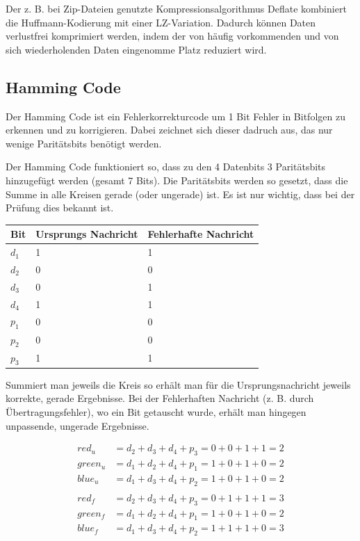 Der z. B. bei Zip-Dateien genutzte Kompressionsalgorithmus Deflate kombiniert
die Huffmann-Kodierung mit einer LZ-Variation. Dadurch können Daten verlustfrei
komprimiert werden, indem der von häufig vorkommenden und von sich wiederholenden
Daten eingenomme Platz reduziert wird. 

\subsection{Hamming Code}

Der Hamming Code ist ein Fehlerkorrekturcode um 1 Bit Fehler in Bitfolgen
zu erkennen und zu korrigieren. Dabei zeichnet sich dieser dadruch aus,
das nur wenige Paritätsbits benötigt werden.

Der Hamming Code funktioniert so, dass zu den 4 Datenbits 3 Paritätsbits
hinzugefügt werden (gesamt 7 Bits). Die Paritätsbits werden so gesetzt,
dass die Summe in alle Kreisen gerade (oder ungerade) ist. Es ist nur wichtig,
dass bei der Prüfung dies bekannt ist.

\begin{table}[H]
    \begin{tabular}{|l|l|l|}
    \hline
        Bit & Ursprungs Nachricht & Fehlerhafte Nachricht \\ \hline
        $d_1$ & 1 & 1 \\ \hline
        $d_2$ & 0 & 0 \\ \hline
        $d_3$ & 0 & 1 \\ \hline
        $d_4$ & 1 & 1 \\ \hline
        $p_1$ & 0 & 0 \\ \hline
        $p_2$ & 0 & 0 \\ \hline
        $p_3$ & 1 & 1 \\ \hline
    \end{tabular}
\end{table}

Summiert man jeweils die Kreis so erhält man für die Ursprungsnachricht
jeweils korrekte, gerade Ergebnisse. Bei der Fehlerhaften Nachricht (z. B. durch
Übertragungsfehler), wo ein Bit getauscht wurde, erhält man hingegen unpassende,
ungerade Ergebnisse.

\begin{align*}
red_u & = d_2 + d_3 + d_4 + p_3 = 0 + 0 + 1 + 1 = 2 \\
green_u & = d_1 + d_2 + d_4 + p_1 = 1 + 0 + 1 + 0 = 2 \\
blue_u & = d_1 + d_3 + d_4 + p_2 = 1 + 0 + 1 + 0 = 2 \\
& \\
red_f & = d_2 + d_3 + d_4 + p_3 = 0 + 1 + 1 + 1 = 3 \\
green_f & = d_1 + d_2 + d_4 + p_1 = 1 + 0 + 1 + 0 = 2 \\
blue_f & = d_1 + d_3 + d_4 + p_2 = 1 + 1 + 1 + 0 = 3 \\
\end{align*}

